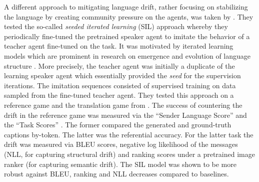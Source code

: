 A different approach to mitigating language drift, rather focusing on stabilizing the language by creating community pressure on the agents, was taken by \cite{lu2020countering}. They tested the so-called \textit{seeded iterated learning} (SIL) approach whereby they periodically fine-tuned the pretrained speaker agent to imitate the behavior of a teacher agent fine-tuned on the task. It was motivated by iterated learning models which are prominent in research on emergence and evolution of language structure \parencite{kirby2014iterated}. More precisely, the teacher agent was initially a duplicate of the learning speaker agent which essentially provided the \textit{seed} for the supervision iterations. The imitation sequences consisted of supervised training on data sampled from the fine-tuned teacher agent. They tested this approach on a reference game and the translation game from \cite{lee2019countering}. The success of countering the drift in the reference game was measured via the ``Sender Language Score'' and the ``Task Scores'' \parencite[][p.~5]{lu2020countering}. The former compared the generated and ground-truth captions by-token. The latter was the referential accuracy. %
For the latter task the drift was measured via BLEU scores, negative log likelihood of the messages (NLL, for capturing structural drift) and ranking scores under a pretrained image ranker (for capturing semantic drift). The SIL model was shown to be more robust against BLEU, ranking and NLL decreases compared to baselines.


